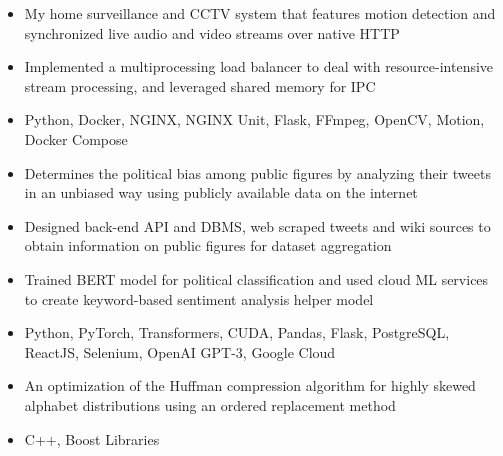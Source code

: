 \documentclass[11pt,letterpaper]{article}
\begin{document}
    \begin{itemize}
      \item{My home surveillance and CCTV system that features motion detection and synchronized live audio and video streams over native HTTP}
      \item{Implemented a multiprocessing load balancer to deal with resource-intensive stream processing, and leveraged shared memory for IPC}
      \item{
        {}
        Python, Docker, NGINX, NGINX Unit, Flask, FFmpeg, OpenCV, Motion, Docker Compose
      }
    \end{itemize}
  \fi

  \ifpolitify
    {\fontsize{12}{12}}

    \begin{itemize}
      \item{Determines the political bias among public figures by analyzing their tweets in an unbiased way using publicly available data on the internet}
      \item{Designed back-end API and DBMS, web scraped tweets and wiki sources to obtain information on public figures for dataset aggregation}
      \item{Trained BERT model for political classification and used cloud ML services to create keyword-based sentiment analysis helper model}
      \item{
        {}
        Python, PyTorch, Transformers, CUDA, Pandas, Flask, PostgreSQL, ReactJS, Selenium, OpenAI GPT-3, Google Cloud
      }
    \end{itemize}
  \fi

  \ifhuffskew
    {\fontsize{12}{12}}

    \begin{itemize}
      \item{An optimization of the Huffman compression algorithm for highly skewed alphabet distributions using an ordered replacement method}
      \item{
        {}
        C++, Boost Libraries
      }
    \end{itemize}
  \fi

  \iffizz
    {\fontsize{12}{12}}
\end{document}
